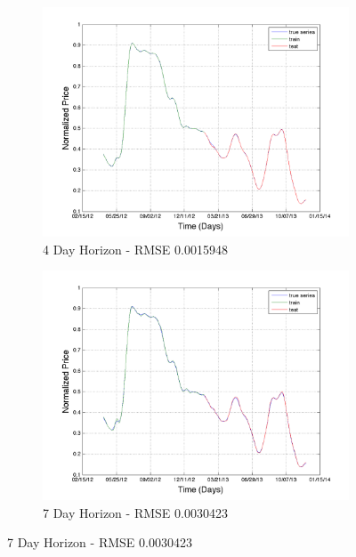 \begin{figure}
        \centering
        \begin{subfigure}[b]{0.5\textwidth}
                \includegraphics[width=\textwidth]{img/model/wheat/model1/pred_4}
                \caption{4 Day Horizon - RMSE 0.0015948 }
                \label{fig:gull}
        \end{subfigure}%
        \begin{subfigure}[b]{0.5\textwidth}
                \includegraphics[width=\textwidth]{img/model/wheat/model1/pred_7}
                \caption{7 Day Horizon - RMSE 0.0030423}
                \label{fig:tiger}
        \end{subfigure}
       

\end{figure}
